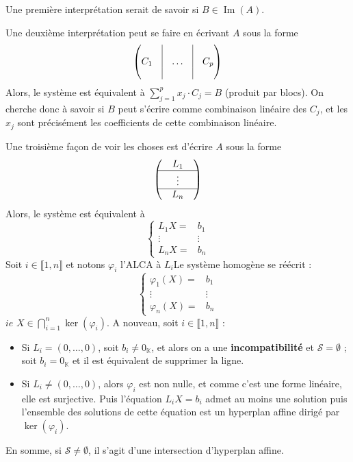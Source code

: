 \documentclass[french]{book}
\newcommand{\C}{\mathbb{C}}
\newcommand{\K}{\mathbb{K}}
\theoremstyle{plain}
\theoremstyle{definition}
\theoremstyle{remark}
\DeclareMathOperator{\im}{Im}
\begin{document}
Une première interprétation serait de savoir si $B\in\im(A)$. \\ \par Une deuxième interprétation peut se faire en écrivant $A$ sous la forme $$\begin{pmatrix}&\vline&&\vline&\\C_1&\vline&\ldots&\vline&C_p\\&\vline&&\vline&\end{pmatrix}$$ Alors, le système est équivalent à $\displaystyle\sum_{j=1}^{p}x_j\cdot C_j=B$ (produit par blocs). On cherche donc à savoir si $B$ peut s'écrire comme combinaison linéaire des $C_j$, et les $x_j$ sont précisément les coefficients de cette combinaison linéaire. \\ \par Une troisième façon de voir les choses est d'écrire $A$ sous la forme $$\begin{pmatrix}&L_1&\\ \hline &\vdots& \\ \hline &L_n&\end{pmatrix}$$ Alors, le système est équivalent à $$\begin{cases}
	L_1X=&b_1\\
	\vdots&\vdots\\
	L_nX=&b_n
\end{cases}$$ Soit $i\in\llbracket1,n\rrbracket$ et notons $\varphi_i$ l'ALCA à $L_i$Le système homogène se réécrit : $$\begin{cases}
\varphi_1(X)=&b_1\\
\vdots&\vdots\\
\varphi_n(X)=&b_n
\end{cases}$$ $ie$ $X\in\displaystyle\bigcap_{i=1}^n\ker(\varphi_i)$. A nouveau, soit $i\in\llbracket1,n\rrbracket$ : \begin{itemize}
	\item Si $L_i=(0,\ldots,0)$, soit $b_i\ne0_\K$, et alors on a une \textbf{incompatibilité} et $\mathcal{S}=\emptyset$ ; soit $b_i=0_\K$ et il est équivalent de supprimer la ligne.
	\item Si $L_i\ne(0,\ldots,0)$, alors $\varphi_i$ est non nulle, et comme c'est une forme linéaire, elle est surjective. Puis l'équation $L_iX=b_i$ admet au moins une solution puis l'ensemble des solutions de cette équation est un hyperplan affine dirigé par $\ker(\varphi_i)$.
\end{itemize}
En somme, si $\mathcal{S}\ne\emptyset$, il s'agit d'une intersection d'hyperplan affine.
\end{document}
